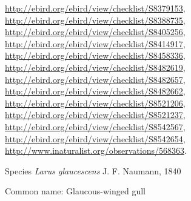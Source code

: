 \documentclass[9pt, article]{memoir}
\begin{document}
\begin{multicols}{2}
\url{http://ebird.org/ebird/view/checklist/S8379153}, 
\url{http://ebird.org/ebird/view/checklist/S8388735}, 
\url{http://ebird.org/ebird/view/checklist/S8405256}, 
\url{http://ebird.org/ebird/view/checklist/S8414917}, 
\url{http://ebird.org/ebird/view/checklist/S8458336}, 
\url{http://ebird.org/ebird/view/checklist/S8482619}, 
\url{http://ebird.org/ebird/view/checklist/S8482657}, 
\url{http://ebird.org/ebird/view/checklist/S8482662}, 
\url{http://ebird.org/ebird/view/checklist/S8521206}, 
\url{http://ebird.org/ebird/view/checklist/S8521237}, 
\url{http://ebird.org/ebird/view/checklist/S8542567}, 
\url{http://ebird.org/ebird/view/checklist/S8542654}, 
\url{http://www.inaturalist.org/observations/568363}.

\vspace{6pt}\noindent\hspace{36pt}Species \textit{Larus glaucescens} J. F. Naumann, 1840


Common name: Glaucous-winged gull


\end{multicols}
\end{document}
